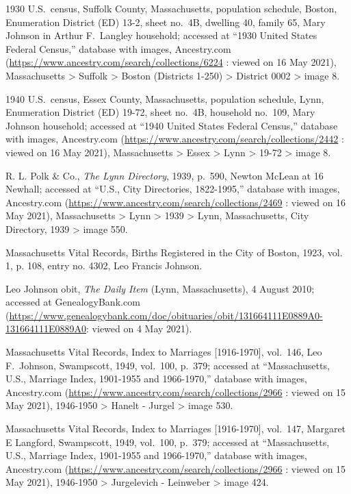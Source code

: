 \begin{thebibliography}{999}
1930 U.S.\ census, Suffolk County, Massachusetts, population schedule, Boston, Enumeration District (ED) 13-2, sheet no.\ 4B, dwelling 40, family 65, Mary Johnson in Arthur F.\ Langley household; accessed at ``1930 United States Federal Census,'' database with images, Ancestry.com (\url{https://www.ancestry.com/search/collections/6224} : viewed on 16 May 2021), Massachusetts > Suffolk > Boston (Districts 1-250) > District 0002 > image 8.

1940 U.S.\ census, Essex County, Massachusetts, population schedule, Lynn, Enumeration District (ED) 19-72, sheet no.\ 4B, household no.\ 109, Mary Johnson household; accessed at ``1940 United States Federal Census,'' database with images, Ancestry.com (\url{https://www.ancestry.com/search/collections/2442} : viewed on 16 May 2021), Massachusetts > Essex > Lynn > 19-72 > image 8.

R. L. Polk \& Co., \textit{The Lynn Directory}, 1939, p.\ 590, Newton McLean at 16 Newhall; accessed at ``U.S., City Directories, 1822-1995,'' database with images, Ancestry.com (\url{https://www.ancestry.com/search/collections/2469} : viewed on 16 May 2021), Massachusetts > Lynn > 1939 > Lynn, Massachusetts, City Directory, 1939 > image 550.

Massachusetts Vital Records, Births Registered in the City of Boston, 1923, vol. 1, p. 108, entry no. 4302, Leo Francis Johnson.

Leo Johnson obit, \textit{The Daily Item} (Lynn, Massachusetts), 4 August 2010; accessed at GenealogyBank.com (\url{https://www.genealogybank.com/doc/obituaries/obit/131664111E0889A0-131664111E0889A0}: viewed on  4 May 2021).

Massachusetts Vital Records, Index to Marriages [1916-1970], vol.\ 146, Leo F.\ Johnson, Swampscott, 1949, vol.\ 100, p.\ 379; accessed at ``Massachusetts, U.S., Marriage Index, 1901-1955 and 1966-1970,'' database with images, Ancestry.com (\url{https://www.ancestry.com/search/collections/2966} : viewed on 15 May 2021), 1946-1950 > Hanelt - Jurgel > image 530.

Massachusetts Vital Records, Index to Marriages [1916-1970], vol.\ 147, Margaret E Langford, Swampscott, 1949, vol.\ 100, p.\ 379; accessed at ``Massachusetts, U.S., Marriage Index, 1901-1955 and 1966-1970,'' database with images, Ancestry.com (\url{https://www.ancestry.com/search/collections/2966} : viewed on 15 May 2021), 1946-1950 > Jurgelevich - Leinweber > image 424.


\end{thebibliography}
